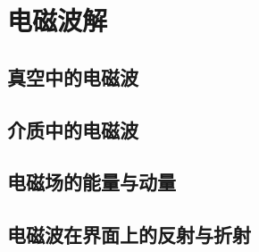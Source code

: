 

\section{电磁波解}\label{20-2}

\subsection{真空中的电磁波}\label{20-2-1}

\subsection{介质中的电磁波}\label{20-2-2}

\subsection{电磁场的能量与动量}\label{20-2-3}

\subsection{电磁波在界面上的反射与折射}\label{20-2-4}